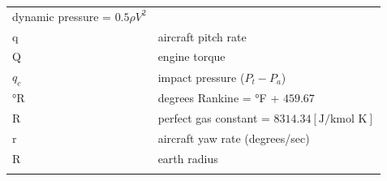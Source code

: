 \documentclass[
]{book}
\begin{document}
\begin{longtable}[]{@{}ll@{}}
\begin{minipage}[t]{0.47\columnwidth}
dynamic pressure = \(0.5 \rho V^2\)\strut
\end{minipage}\tabularnewline
\begin{minipage}[t]{0.47\columnwidth}\raggedright
q\strut
\end{minipage} & \begin{minipage}[t]{0.47\columnwidth}\raggedright
aircraft pitch rate\strut
\end{minipage}\tabularnewline
\begin{minipage}[t]{0.47\columnwidth}\raggedright
Q\strut
\end{minipage} & \begin{minipage}[t]{0.47\columnwidth}\raggedright
engine torque\strut
\end{minipage}\tabularnewline
\begin{minipage}[t]{0.47\columnwidth}\raggedright
\(q_c\)\strut
\end{minipage} & \begin{minipage}[t]{0.47\columnwidth}\raggedright
impact pressure (\(P_t − P_a\))\strut
\end{minipage}\tabularnewline
\begin{minipage}[t]{0.47\columnwidth}\raggedright
°R\strut
\end{minipage} & \begin{minipage}[t]{0.47\columnwidth}\raggedright
degrees Rankine = °F + \(459.67\)\strut
\end{minipage}\tabularnewline
\begin{minipage}[t]{0.47\columnwidth}\raggedright
R\strut
\end{minipage} & \begin{minipage}[t]{0.47\columnwidth}\raggedright
perfect gas constant = \(8314.34 \left[ \text{J/kmol K} \right]\)\strut
\end{minipage}\tabularnewline
\begin{minipage}[t]{0.47\columnwidth}\raggedright
r\strut
\end{minipage} & \begin{minipage}[t]{0.47\columnwidth}\raggedright
aircraft yaw rate (degrees/sec)\strut
\end{minipage}\tabularnewline
\begin{minipage}[t]{0.47\columnwidth}\raggedright
R\strut
\end{minipage} & \begin{minipage}[t]{0.47\columnwidth}\raggedright
earth radius\strut
\end{minipage}\tabularnewline
\begin{minipage}[t]{0.47\columnwidth}\raggedright

\end{minipage}
\end{longtable}
\end{document}
